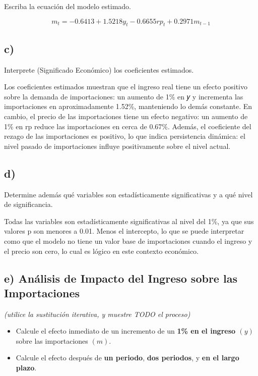 \documentclass[
  11pt,
  letterpaper,
  DIV=11,
  numbers=noendperiod]{scrartcl}
\providecommand{\tightlist}{%
  \setlength{\itemsep}{0pt}\setlength{\parskip}{0pt}}
\begin{document}
Escriba la ecuación del modelo estimado.

\[
m_t​=−0.6413+1.5218y_t​−0.6655rp_t​+0.2971m_{t−1}​ 
\]

\subsection{c)}\label{c}

Interprete (Significado Económico) los coeficientes estimados.

Los coeficientes estimados muestran que el ingreso real tiene un efecto
positivo sobre la demanda de importaciones: un aumento de 1\% en 𝑦 y
incrementa las importaciones en aproximadamente 1.52\%, manteniendo lo
demás constante. En cambio, el precio de las importaciones tiene un
efecto negativo: un aumento de 1\% en rp reduce las importaciones en
cerca de 0.67\%. Además, el coeficiente del rezago de las importaciones
es positivo, lo que indica persistencia dinámica: el nivel pasado de
importaciones influye positivamente sobre el nivel actual.

\subsection{d)}\label{d}

Determine además qué variables son estadísticamente significativas y a
qué nivel de significancia.

Todas las variables son estadísticamente significativas al nivel del
1\%, ya que sus valores p son menores a 0.01. Menos el intercepto, lo
que se puede interpretar como que el modelo no tiene un valor base de
importaciones cuando el ingreso y el precio son cero, lo cual es lógico
en este contexto económico.

\subsection{e) Análisis de Impacto del Ingreso sobre las
Importaciones}\label{e-anuxe1lisis-de-impacto-del-ingreso-sobre-las-importaciones}

\emph{(utilice la sustitución iterativa, y muestre TODO el proceso)}

\begin{itemize}
\tightlist
\item
  Calcule el efecto inmediato de un incremento de un \textbf{1\% en el
  ingreso \((y)\)} sobre las importaciones \((m)\).
\item
  Calcule el efecto después de \textbf{un periodo}, \textbf{dos
  periodos}, y \textbf{en el largo plazo}.
\end{itemize}
\end{document}
